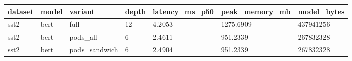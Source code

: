 \begin{tabular}{lllllll}
\hline
dataset & model & variant & depth & latency\_ms\_p50 & peak\_memory\_mb & model\_bytes \\
\hline
sst2 & bert & full & 12 & 4.2053 & 1275.6909 & 437941256 \\
sst2 & bert & pods\_all & 6 & 2.4611 & 951.2339 & 267832328 \\
sst2 & bert & pods\_sandwich & 6 & 2.4904 & 951.2339 & 267832328 \\
\hline
\end{tabular}
